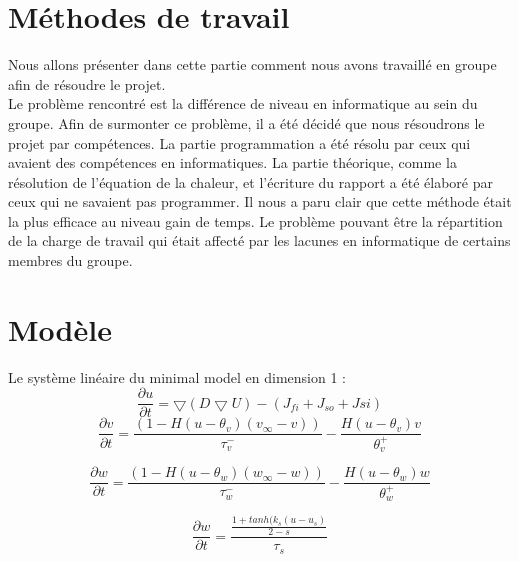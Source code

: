 \documentclass[a4paper,12pt,twoside]{report}
\begin{document}
\section{Méthodes de travail}


Nous allons présenter dans cette partie comment nous avons travaillé en groupe afin de résoudre le projet.\\ 
\hspace*{1cm} Le problème rencontré est la différence de niveau en informatique au sein du groupe. Afin de surmonter ce problème, il a été décidé que nous résoudrons le projet par compétences. La partie programmation a été résolu par ceux qui avaient des compétences en informatiques. La partie théorique, comme la résolution de l'équation de la chaleur, et l'écriture du rapport a été élaboré par ceux qui ne savaient pas programmer. Il nous a paru clair que cette méthode était la plus efficace au niveau gain de temps. Le problème pouvant être la répartition de la charge de travail qui était affecté par les lacunes en informatique de certains membres du groupe.\\
















\section{Modèle}




Le système linéaire du minimal model en dimension 1 :
\begin{equation}
\frac{\partial u}{\partial t}=\bigtriangledown( D \bigtriangledown U )-(J_{fi}+J_{so}+    J{si})
\end{equation}
\begin{equation}
\frac{\partial v}{\partial t}=\frac{(1-H(u-\theta_v)(v_\infty -v))}{\tau_v^-}-\frac{H(u-\theta_v)v}{\theta_v^+}
\end{equation}

\begin{equation}
\frac{\partial w}{\partial t}=\frac{(1-H(u-\theta_w)(w_\infty -w))}{\tau_w^-}-\frac{H(u-\theta_w)w}{\theta_w^+}
\end{equation}

\begin{equation}
\frac{\partial w}{\partial t}=\frac{\frac{1+tanh(k_s(u-u_s)}{2-s}}{\tau_s}
\end{equation}
\end{document}
